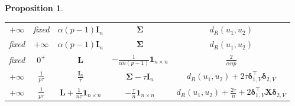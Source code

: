 \documentclass[12pt]{article}
\theoremstyle{plain}
\newtheorem{proposition}{Proposition}
\theoremstyle{remark}
\newcommand{\onenn}[0]{{\mathbf{1}_{n\times n}}}
\newcommand{\dVec}[1]{{\bm{#1}}}            %
\newcommand{\latMatr}[1]{\mathbf{#1}}          %
\newcommand{\grMatr}[1]{{\boldsymbol{#1}}}   %
\begin{document}
\begin{proposition}
\begin{table}
\begin{center}
\begin{tabular}{|c|c|c|c|c|}
                    \hline
                    $+\infty$ & fixed & $\alpha(p-1){\latMatr{I}_n}$ & ${\grMatr{\Sigma}}$ & $d_R(u_1,u_2)$ \\
                    fixed & $+\infty$ & $\alpha(p-1){\latMatr{I}_n}$ & ${\grMatr{\Sigma}}$ & $d_R(u_1,u_2)$ \\
                    fixed & $0^+$ & ${\latMatr{L}}$ & $-\frac{1}{\alpha n (p-1)}\onenn$ & $\frac{2}{\alpha n p}$\\
                    $+\infty$ & $\frac{1}{p\tau}$ & $\frac{\latMatr I_n}{\tau}$ & $\grMatr{\Sigma} - \tau \latMatr I_n$ & $d_R(u_1,u_2) + 2\tau \dVec \delta_{1,V}^\top \dVec \delta_{2,V}$\\
                    $+\infty$ & $\frac{1}{p\tau}$ & $\latMatr L + \frac{1}{n\tau} \onenn $ & $-\frac{\tau}{n}\onenn $ & $d_R(u_1,u_2)+\frac{2\tau}{n} + 2\dVec{\delta}_{1,V}^\top \latMatr X \dVec{\delta}_{2,V}$\\
                    \hline
                \end{tabular}
            \end{center}
            \label{tab:asympt}
        \end{table}
    \end{proposition}
    
\end{document}
